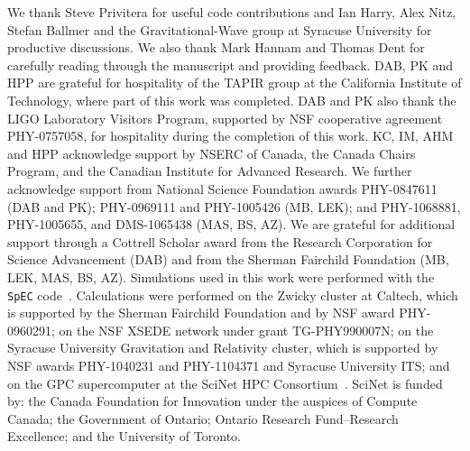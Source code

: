 \documentclass[aps,
prd,
twocolumn,
superscriptaddress,
lengthcheck,showpacs,letterpaper,nofootinbib,
floatfix]{revtex4-1}
\begin{document}
We thank Steve Privitera for useful code contributions and Ian Harry,
Alex Nitz, Stefan Ballmer and the Gravitational-Wave group at Syracuse
University for productive discussions. We also thank Mark Hannam and 
Thomas Dent for carefully reading through the manuscript and providing 
feedback.
%
DAB, PK and HPP are grateful for hospitality of the TAPIR
group at the California Institute of Technology, where part of this
work was completed.  DAB and PK also thank the LIGO Laboratory
Visitors Program, supported by NSF cooperative agreement PHY-0757058,
for hospitality during the completion of this
work.
%
KC, IM, AHM and HPP acknowledge support by NSERC of Canada, the Canada
Chairs Program, and the Canadian Institute for Advanced Research.  We
further acknowledge support from National Science Foundation awards
PHY-0847611 (DAB and PK); PHY-0969111 and PHY-1005426 (MB, LEK); and
PHY-1068881, PHY-1005655, and DMS-1065438 (MAS, BS, AZ).  We are
grateful for additional support through a Cottrell Scholar award from the
Research Corporation for Science Advancement (DAB) and from the Sherman
Fairchild Foundation (MB, LEK, MAS, BS, AZ).
%
Simulations used in this work were performed with the \texttt{SpEC}
code~\cite{spec}.  Calculations were performed on the Zwicky cluster
at Caltech, which is supported by the Sherman Fairchild Foundation and
by NSF award PHY-0960291; on the NSF XSEDE network under grant
TG-PHY990007N; on the Syracuse University Gravitation and Relativity
cluster, which is supported by NSF awards PHY-1040231 and PHY-1104371
and Syracuse University ITS; and on the GPC supercomputer at the
SciNet HPC Consortium~\cite{scinet}. SciNet is funded by: the Canada
Foundation for Innovation under the auspices of Compute Canada; the
Government of Ontario; Ontario Research Fund--Research Excellence; and
the University of Toronto.  
\FloatBarrier


\end{document}
